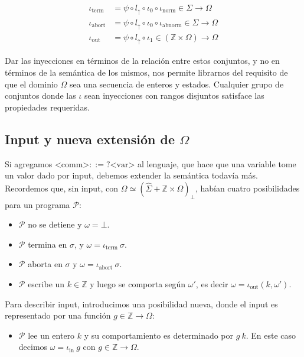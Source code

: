 \documentclass[article, 12pt]{article}
\begin{document}
\begin{align*}
  \iota_{\text{term}} &= \psi \circ l_{\uparrow} \circ \iota_0 \circ
  \iota_\text{norm} \in \Sigma \to \Omega \\ 
  \iota_{\text{abort}} &= \psi \circ l_{\uparrow} \circ \iota_0 \circ
  \iota_\text{abnorm} \in \Sigma \to \Omega\\
  \iota_{\text{out}} &= \psi \circ l_{\uparrow} \circ \iota_1 \in (\mathbb{Z}
  \times \Omega) \to \Omega
\end{align*}

Dar las inyecciones en términos de la relación entre estos conjuntos, y no en
términos de la semántica de los mismos, nos permite librarnos del requisito de
que el dominio $\Omega$ sea una secuencia de enteros y estados. Cualquier grupo
de conjuntos donde las $\iota$ sean inyecciones con rangos disjuntos satisface
las propiedades requeridas.

\subsection{Input y nueva extensión de $\Omega$}

Si agregamos $\text{<comm>} ::= ?\text{<var>}$ al lenguaje, que hace que una
variable tome un valor dado por input, debemos extender la semántica todavía
más. Recordemos que, sin input, con $\Omega \simeq (\hat{\Sigma} + \mathbb{Z}
\times \Omega)_\bot $, habían cuatro posibilidades para un programa
$\mathcal{P}$:

\begin{itemize}
  \item $\mathcal{P}$ no se detiene y $\omega = \bot $.
  \item $\mathcal{P}$ termina en $\sigma$, y $\omega = \iota_{\text{term}} ~
    \sigma$. 
  \item $\mathcal{P}$ aborta en $\sigma$ y $\omega = \iota_{\text{abort}} ~
    \sigma$. 
  \item $\mathcal{P}$ escribe un $k \in \mathbb{Z}$ y luego se comporta según
    $\omega'$, es decir $\omega = \iota_{\text{out}}(k, \omega')$.
\end{itemize}

Para describir input, introducimos una posibilidad nueva, donde el input es
representado por una función $g \in \mathbb{Z} \to \Omega$:

\begin{itemize}
  \item $\mathcal{P}$ lee un entero $k$ y su comportamiento es determinado por
    $g ~ k$. En este caso decimos $\omega = \iota_{\text{in}} ~ g$ con $g \in
    \mathbb{Z} \to \Omega$.
\end{itemize}
\end{document}
